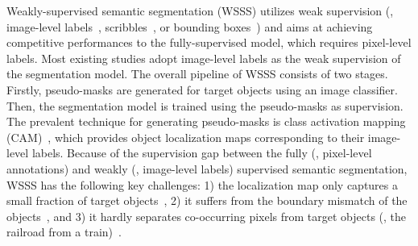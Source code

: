 \documentclass[final]{cvpr}
\begin{document}
Weakly-supervised semantic segmentation (WSSS) utilizes weak supervision (\eg, image-level labels~\cite{pathak2015constrained, pinheiro2015image}, scribbles~\cite{lin2016scribblesup}, or bounding boxes~\cite{khoreva2017simple}) and aims at achieving competitive performances to the fully-supervised model, which requires pixel-level labels. Most existing studies adopt image-level labels as the weak supervision of the segmentation model. The overall pipeline of WSSS consists of two stages. Firstly, pseudo-masks are generated for target objects using an image classifier. Then, the segmentation model is trained using the pseudo-masks as supervision. The prevalent technique for generating pseudo-masks is class activation mapping (CAM)~\cite{zhou2016learning}, which provides object localization maps corresponding to their image-level labels. Because of the supervision gap between the fully (\ie, pixel-level annotations) and weakly (\ie, image-level labels) supervised semantic segmentation, WSSS has the following key challenges: 1) the localization map only captures a small fraction of target objects~\cite{zhou2016learning}, 2) it suffers from the boundary mismatch of the objects~\cite{kim2017two}, and 3) it hardly separates co-occurring pixels from target objects (\eg, the railroad from a train)~\cite{kolesnikov2016seed}. 
\end{document}
